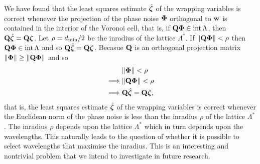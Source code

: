 We have found that the least squares estimate $\hat{\boldsymbol{\zeta}}$ of the wrapping variables is correct whenever the projection of the phase noise $\boldsymbol{\Phi}$ orthogonal to $\mathbf{w}$ is contained in the interior of the Voronoi cell, that is, if $\mathbf{Q} \boldsymbol{\Phi} \in \operatorname{int} \Lambda$, then $\mathbf{Q} \hat{\boldsymbol{\zeta}} = \mathbf{Q} \boldsymbol{\zeta}$.  Let $\rho = d_{\text{min}}/2$ be the inradius of the lattice $\Lambda^*$.  If $\|\mathbf{Q} \boldsymbol{\Phi}\| < \rho$ then $\mathbf{Q} \boldsymbol{\Phi} \in \operatorname{int} \Lambda$ and so $\mathbf{Q} \hat{\boldsymbol{\zeta}} = \mathbf{Q} \boldsymbol{\zeta}$.  Becasue $\mathbf{Q}$ is an orthogonal projection matrix $\|\boldsymbol{\Phi}\| \geq \|\mathbf{Q}\boldsymbol{\Phi}\|$ and so 
\begin{align*}
&\|\boldsymbol{\Phi}\| < \rho \\
\implies &\|\mathbf{Q}\boldsymbol{\Phi}\| < \rho \\
\implies &\mathbf{Q} \hat{\boldsymbol{\zeta}} = \mathbf{Q} \boldsymbol{\zeta},
\end{align*}
that is, the least squares estimate $\hat{\boldsymbol{\zeta}}$ of the wrapping variables is correct whenever the Euclidean norm of the phase noise is less than the inradius $\rho$ of the lattice $\Lambda^*$.  The inradius $\rho$ depends upon the lattice $\Lambda^*$ which in turn depends upon the wavelengths.  This naturally leads to the question of whether it is possible to select wavelengths that maximise the inradius.  This is an interesting and nontrivial problem that we intend to investigate in future research.



